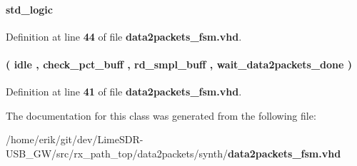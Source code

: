 \paragraph[{smpl\+\_\+buff\+\_\+rd\+\_\+done}]{ {\bfseries \textcolor{comment}{std\+\_\+logic}\textcolor{vhdlchar}{ }} \hspace{0.3cm}{\ttfamily [Signal]}}\label{classdata2packets__fsm_1_1arch_aab7e12e161678bb67620300c245f9832}


Definition at line {\bf 44} of file {\bf data2packets\+\_\+fsm.\+vhd}.

\paragraph[{state\+\_\+type}]{ {\bfseries \textcolor{vhdlchar}{(}\textcolor{vhdlchar}{ }\textcolor{vhdlchar}{idle}\textcolor{vhdlchar}{ }\textcolor{vhdlchar}{,}\textcolor{vhdlchar}{ }\textcolor{vhdlchar}{check\+\_\+pct\+\_\+buff}\textcolor{vhdlchar}{ }\textcolor{vhdlchar}{,}\textcolor{vhdlchar}{ }\textcolor{vhdlchar}{rd\+\_\+smpl\+\_\+buff}\textcolor{vhdlchar}{ }\textcolor{vhdlchar}{,}\textcolor{vhdlchar}{ }\textcolor{vhdlchar}{wait\+\_\+data2packets\+\_\+done}\textcolor{vhdlchar}{ }\textcolor{vhdlchar}{)}\textcolor{vhdlchar}{ }} \hspace{0.3cm}{\ttfamily [Type]}}\label{classdata2packets__fsm_1_1arch_a423646b8f8d160137ef3f73adae5980b}


Definition at line {\bf 41} of file {\bf data2packets\+\_\+fsm.\+vhd}.



The documentation for this class was generated from the following file\+:\begin{DoxyCompactItemize}
\item 
/home/erik/git/dev/\+Lime\+S\+D\+R-\/\+U\+S\+B\+\_\+\+G\+W/src/rx\+\_\+path\+\_\+top/data2packets/synth/{\bf data2packets\+\_\+fsm.\+vhd}\end{DoxyCompactItemize}
